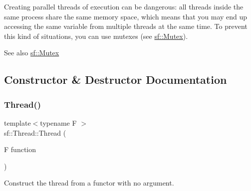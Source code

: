 \begin{DoxyCode}{0}
\DoxyCodeLine{\textcolor{comment}{// example 3: functor}}
\DoxyCodeLine{}
\DoxyCodeLine{\{}
\DoxyCodeLine{    \{}
\DoxyCodeLine{    \}}
\DoxyCodeLine{\};}
\DoxyCodeLine{}
\end{DoxyCode}


Creating parallel threads of execution can be dangerous\+: all threads inside the same process share the same memory space, which means that you may end up accessing the same variable from multiple threads at the same time. To prevent this kind of situations, you can use mutexes (see \mbox{\hyperlink{classsf_1_1_mutex}{sf\+::\+Mutex}}).

\begin{DoxySeeAlso}{See also}
\mbox{\hyperlink{classsf_1_1_mutex}{sf\+::\+Mutex}} \begin{DoxyVerb}\end{DoxyVerb}
 
\end{DoxySeeAlso}


\subsection{Constructor \& Destructor Documentation}
\mbox{\label{classsf_1_1_thread_a4cc65399bbb111cf8132537783b8e96c}} 
\subsubsection{\texorpdfstring{Thread()}{Thread()}\hspace{0.1cm}{\footnotesize\ttfamily [1/3]}}
{\footnotesize\ttfamily template$<$typename F $>$ \\
sf\+::\+Thread\+::\+Thread (\begin{DoxyParamCaption}\item[{F}]{function }\end{DoxyParamCaption})}



Construct the thread from a functor with no argument. 

